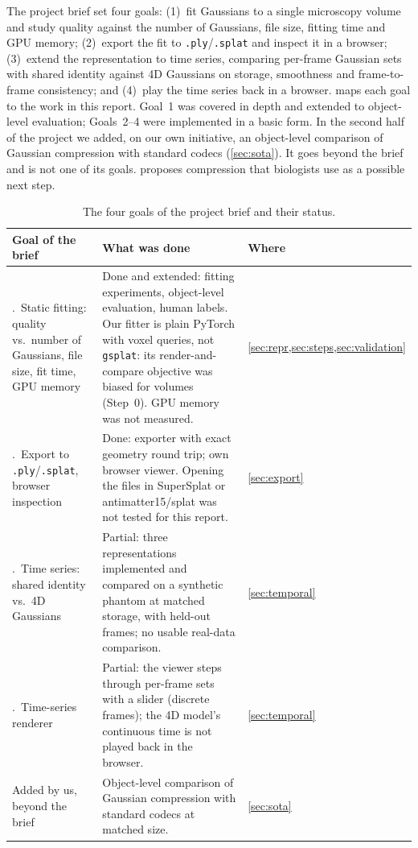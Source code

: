 \documentclass[
  paper=a4,
  fontsize=11pt,
  english,
  numbers=noenddot,
  parskip=half,
  cdgeometry=symmetric,
  cd=barcolor,
  cdfont=false
]{tudscrartcl}
\begin{document}
The project brief set four goals: (1)~fit Gaussians to a single microscopy volume and study
quality against the number of Gaussians, file size, fitting time and GPU memory; (2)~export
the fit to \texttt{.ply}/\texttt{.splat} and inspect it in a browser; (3)~extend the
representation to time series, comparing per-frame Gaussian sets with shared identity against
4D Gaussians on storage, smoothness and frame-to-frame consistency; and (4)~play the time
series back in a browser.  maps each goal to the work in this report. Goal~1
was covered in depth and extended to object-level evaluation; Goals~2--4 were implemented in
a basic form. In the second half of the project we added, on our own initiative, an
object-level comparison of Gaussian compression with standard codecs (\cref{sec:sota}). It
goes beyond the brief and is not one of its goals.  proposes compression
that biologists use as a possible next step.

\begin{table}[tb]
  \centering\small
  \begin{tabularx}{\linewidth}{@{}>{\raggedright\arraybackslash}p{3.7cm}>{\raggedright\arraybackslash}X>{\raggedright\arraybackslash}p{1.5cm}@{}}
    \toprule
    Goal of the brief & What was done & Where \\
    \midrule
    1.~Static fitting: quality vs.\ number of Gaussians, file size, fit time, GPU memory
      & Done and extended: fitting experiments, object-level evaluation, human labels. Our fitter
        is plain PyTorch with voxel queries, not \texttt{gsplat}: its render-and-compare
        objective was biased for volumes (Step~0). GPU memory was not measured.
      & \cref{sec:repr,sec:steps,sec:validation} \\
    2.~Export to \texttt{.ply}/\texttt{.splat}, browser inspection
      & Done: exporter with exact geometry round trip; own browser viewer. Opening the files in
        SuperSplat or antimatter15/splat was not tested for this report.
      & \cref{sec:export} \\
    3.~Time series: shared identity vs.\ 4D Gaussians
      & Partial: three representations implemented and compared on a synthetic phantom at
        matched storage, with held-out frames; no usable real-data comparison.
      & \cref{sec:temporal} \\
    4.~Time-series renderer
      & Partial: the viewer steps through per-frame sets with a slider (discrete frames); the
        4D model's continuous time is not played back in the browser.
      & \cref{sec:temporal} \\
    Added by us, beyond the brief
      & Object-level comparison of Gaussian compression with standard codecs at matched size.
      & \cref{sec:sota} \\
    \bottomrule
  \end{tabularx}
  \caption{The four goals of the project brief and their status.}
  \label{tab:scope}
\end{table}
\end{document}
